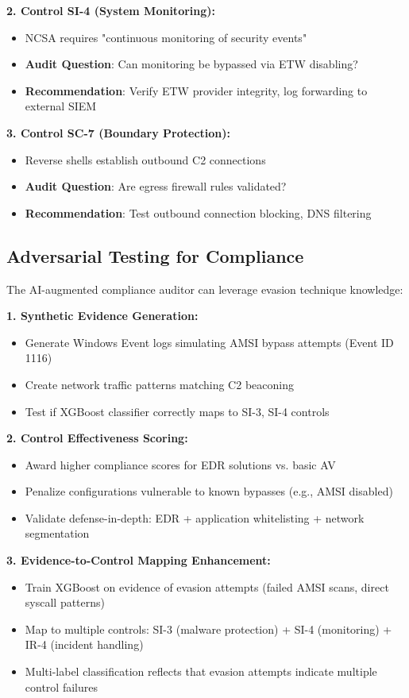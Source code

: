 \documentclass[11pt,conference]{IEEEtran}
\begin{document}
\textbf{2. Control SI-4 (System Monitoring):}
\begin{itemize}
    \item NCSA requires "continuous monitoring of security events"
    \item \textbf{Audit Question}: Can monitoring be bypassed via ETW disabling?
    \item \textbf{Recommendation}: Verify ETW provider integrity, log forwarding to external SIEM
\end{itemize}

\textbf{3. Control SC-7 (Boundary Protection):}
\begin{itemize}
    \item Reverse shells establish outbound C2 connections
    \item \textbf{Audit Question}: Are egress firewall rules validated?
    \item \textbf{Recommendation}: Test outbound connection blocking, DNS filtering
\end{itemize}

\subsection{Adversarial Testing for Compliance}

The AI-augmented compliance auditor can leverage evasion technique knowledge:

\textbf{1. Synthetic Evidence Generation:}
\begin{itemize}
    \item Generate Windows Event logs simulating AMSI bypass attempts (Event ID 1116)
    \item Create network traffic patterns matching C2 beaconing
    \item Test if XGBoost classifier correctly maps to SI-3, SI-4 controls
\end{itemize}

\textbf{2. Control Effectiveness Scoring:}
\begin{itemize}
    \item Award higher compliance scores for EDR solutions vs. basic AV
    \item Penalize configurations vulnerable to known bypasses (e.g., AMSI disabled)
    \item Validate defense-in-depth: EDR + application whitelisting + network segmentation
\end{itemize}

\textbf{3. Evidence-to-Control Mapping Enhancement:}
\begin{itemize}
    \item Train XGBoost on evidence of evasion attempts (failed AMSI scans, direct syscall patterns)
    \item Map to multiple controls: SI-3 (malware protection) + SI-4 (monitoring) + IR-4 (incident handling)
    \item Multi-label classification reflects that evasion attempts indicate multiple control failures
\end{itemize}
\end{document}
